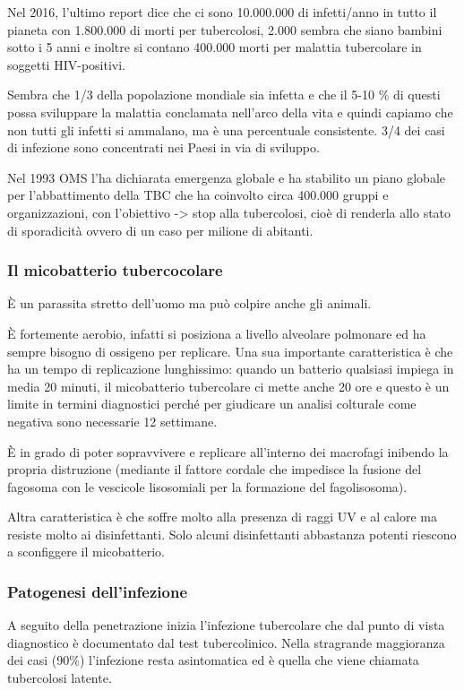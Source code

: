 Nel 2016, l'ultimo report dice che ci sono 10.000.000 di infetti/anno in
tutto il pianeta con 1.800.000 di morti per tubercolosi, 2.000 sembra
che siano bambini sotto i 5 anni e inoltre si contano 400.000 morti per
malattia tubercolare in soggetti HIV-positivi.

Sembra che 1/3 della popolazione mondiale sia infetta e che il 5-10 \%
di questi possa sviluppare la malattia conclamata nell'arco della vita e
quindi capiamo che non tutti gli infetti si ammalano, ma è una
percentuale consistente. 3/4 dei casi di infezione sono concentrati nei
Paesi in via di sviluppo.

Nel 1993 OMS l'ha dichiarata emergenza globale e ha stabilito un piano
globale per l'abbattimento della TBC che ha coinvolto circa 400.000
gruppi e organizzazioni, con l'obiettivo -> stop alla tubercolosi, cioè
di renderla allo stato di sporadicità ovvero di un caso per milione di
abitanti.

\subsubsection{Il micobatterio tubercocolare}


È un parassita stretto dell'uomo ma può colpire anche gli animali.

È fortemente aerobio, infatti si posiziona a livello alveolare polmonare
ed ha sempre bisogno di ossigeno per replicare. Una sua importante
caratteristica è che ha un tempo di replicazione lunghissimo: quando un
batterio qualsiasi impiega in media 20 minuti, il micobatterio
tubercolare ci mette anche 20 ore e questo è un limite in termini
diagnostici perché per giudicare un analisi colturale come negativa sono
necessarie 12 settimane.

È in grado di poter sopravvivere e replicare all'interno dei macrofagi
inibendo la propria distruzione (mediante il fattore cordale che
impedisce la fusione del fagosoma con le vescicole lisosomiali per la
formazione del fagolisosoma).

Altra caratteristica è che soffre molto alla presenza di raggi UV e al
calore ma resiste molto ai disinfettanti. Solo alcuni disinfettanti
abbastanza potenti riescono a sconfiggere il micobatterio.

\subsubsection{Patogenesi dell'infezione}


A seguito della penetrazione inizia l'infezione tubercolare che dal
punto di vista diagnostico è documentato dal test tubercolinico. Nella
stragrande maggioranza dei casi (90\%) l'infezione resta asintomatica ed
è quella che viene chiamata tubercolosi latente.

